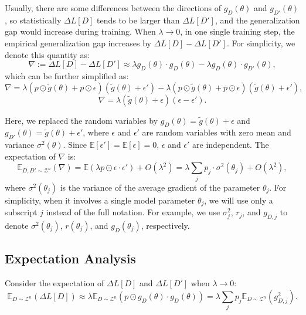 \documentclass{article}
\theoremstyle{plain}
\theoremstyle{definition}
\theoremstyle{remark}
\begin{document}
Usually, there are some differences between the directions of \(g_D(\theta)\) and \(g_{D'}(\theta)\), so statistically \(\Delta L[D]\) tends to be larger than \(\Delta L[D']\), and the generalization gap would increase during training. When \(\lambda \to 0\), in one single training step, the empirical generalization gap increases by \(\Delta L[D] - \Delta L[D']\). For simplicity, we denote this quantity as:
\begin{equation}
\nabla := \Delta L[D] - \Delta L[D'] 
\approx \lambda g_D(\theta) \cdot g_D(\theta) - \lambda g_D(\theta) \cdot g_{D'}(\theta),
\end{equation}
which can be further simplified as:
\begin{equation}
    \nabla = \lambda (p \odot\tilde{g}(\theta) + p \odot\epsilon) (\tilde{g}(\theta) + \epsilon') - \lambda (p \odot\tilde{g}(\theta) + p \odot\epsilon) (\tilde{g}(\theta) + \epsilon'),
\end{equation}
\begin{equation}
    \nabla = \lambda (\tilde{g}(\theta) + \epsilon) (\epsilon - \epsilon').
\end{equation}

Here, we replaced the random variables by \(g_D(\theta) = \tilde{g}(\theta) + \epsilon\) and \(g_{D'}(\theta) = \tilde{g}(\theta) + \epsilon'\), where \(\epsilon\) and \(\epsilon'\) are random variables with zero mean and variance \(\sigma^2(\theta)\). Since \(\mathbb{E}[\epsilon'] = \mathbb{E}[\epsilon] = 0\), \(\epsilon\) and \(\epsilon'\) are independent. The expectation of \(\nabla\) is:
\begin{equation}
\mathbb{E}_{D, D' \sim \mathcal{Z}^n}(\nabla) = \mathbb{E}(\lambda p \odot \epsilon \cdot \epsilon') + O(\lambda^2) = \lambda \sum_j p_j \cdot \sigma^2(\theta_j) + O(\lambda^2),
\end{equation}
where \(\sigma^2(\theta_j)\) is the variance of the average gradient of the parameter \(\theta_j\). For simplicity, when it involves a single model parameter \(\theta_j\), we will use only a subscript \(j\) instead of the full notation. For example, we use \(\sigma_j^2\), \(r_j\), and \(g_{D,j}\) to denote \(\sigma^2(\theta_j)\), \(r(\theta_j)\), and \(g_D(\theta_j)\), respectively.

\subsection*{Expectation Analysis}

Consider the expectation of \(\Delta L[D]\) and \(\Delta L[D']\) when \(\lambda \to 0\):
\begin{equation}
\mathbb{E}_{D \sim \mathcal{Z}^n}(\Delta L[D]) \approx \lambda \mathbb{E}_{D \sim \mathcal{Z}^n}(p \odot g_D(\theta) \cdot g_D(\theta)) = \lambda \sum_j p_j\mathbb{E}_{D \sim \mathcal{Z}^n}(g_{D,j}^2).
\label{eq:15}
\end{equation}
\end{document}
